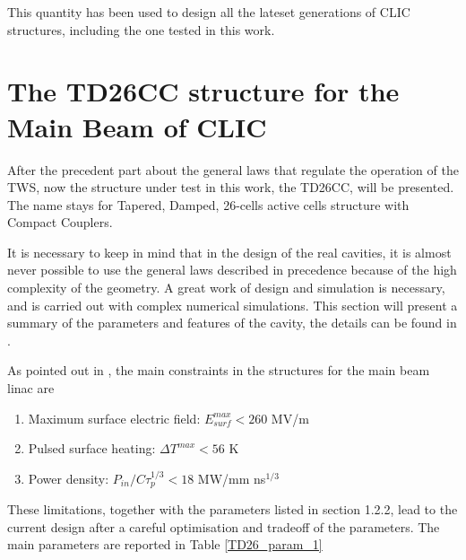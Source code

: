 This quantity has been used to design all the lateset generations of CLIC structures, including the one tested in this work.






\section[The TD26CC structure for the Main Beam of CLIC]{The TD26CC structure for the Main Beam of CLIC}

After the precedent part about the general laws that regulate the operation of the TWS, now the structure under test in this work, the TD26CC, will be presented. The name stays for Tapered, Damped, 26-cells active cells structure with Compact Couplers.

It is necessary to keep in mind that in the design of the real cavities, it is almost never possible to use the general laws described in precedence because of the high complexity of the geometry. A great work of design and simulation is necessary, and is carried out with complex numerical simulations. This section will present a summary of the parameters and features of the cavity, the details can be found in \cite{CLIC:cdr,Grudiev:td26cc,Lunin:1333709}.

As pointed out in \cite{CLIC:cdr}, the main constraints in the structures for the main beam linac are 
\begin{enumerate}
\item Maximum surface electric field: $E_{surf}^{max} < 260$ MV/m
\item Pulsed surface heating: $\Delta T^{max} < 56$ K
\item Power density: $P_{in}/C\tau_p^{1/3} < 18$ MW/mm ns$^{1/3}$
\end{enumerate}

These limitations, together with the parameters listed in section 1.2.2, lead to the current design after a careful optimisation and tradeoff of the parameters. The main parameters are reported in Table \ref{TD26_param_1}

